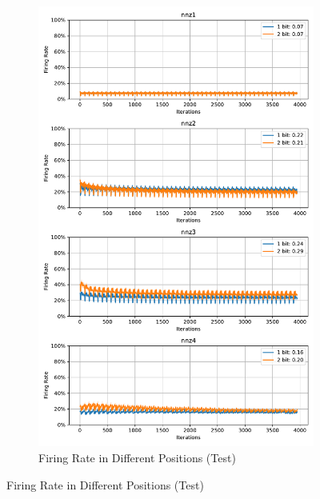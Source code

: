         \begin{figure}[H]
            \centering
            \ContinuedFloat
            \begin{subfigure}[H]{\textwidth}
                \centering
                \includegraphics[width=\textwidth]{../firerate/NMNIST/plots/nmnist_test_firerate.pdf}
                \caption{Firing Rate in Different Positions (Test)}
            \end{subfigure}
        \end{figure}
